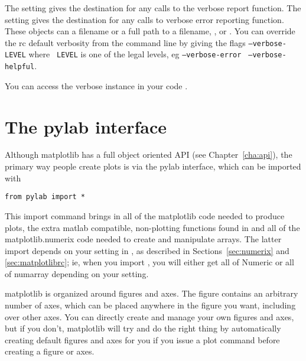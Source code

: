 \documentclass[twoside]{book}
\begin{document}
The  setting gives the destination for any calls to
the verbose report function.  The  setting gives the
destination for any calls to verbose error reporting function.  These
objects can a filename or a full path to a filename, ,
or .  You can override the rc default verbosity from
the command line by giving the flags {\tt--verbose-LEVEL} where {\tt
  LEVEL} is one of the legal levels, eg {\tt --verbose-error} {\tt
  --verbose-helpful}.

You can access the verbose instance in your code 
.


\chapter{The pylab interface}
\label{cha:matlab_interface}

Although matplotlib has a full object oriented API (see
Chapter~\ref{cha:api}), the primary way people create plots is via the
pylab interface, which can be imported with

\begin{lstlisting}
from pylab import *
\end{lstlisting}

\noindent This import command brings in all of the matplotlib code
needed to produce plots, the extra matlab compatible, non-plotting
functions found in  and all of the
matplotlib.numerix code needed to create and manipulate arrays.  The
latter import depends on your  setting in
, as described in Sections~\ref{sec:numerix} and
\ref{sec:matplotlibrc}; ie, when you import
, you will either get all of Numeric or all
of numarray depending on your  setting.

matplotlib is organized around figures and axes.  The figure contains
an arbitrary number of axes, which can be placed anywhere in the
figure you want, including over other axes.  You can directly create
and manage your own figures and axes, but if you don't, matplotlib
will try and do the right thing by automatically creating default
figures and axes for you if you issue a plot command before creating a
figure or axes. 
\end{document}
